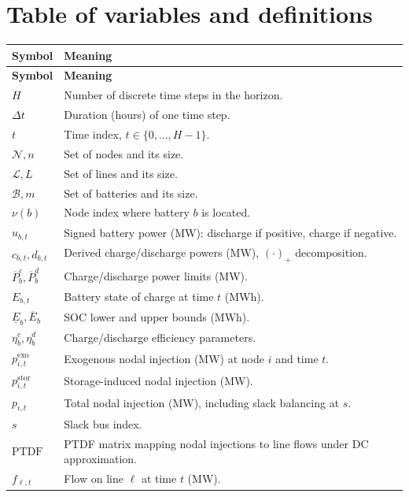 \documentclass[11pt]{article}
\begin{document}
\section{Table of variables and definitions}\label{app:notation}
\begin{longtable}{@{}>{\raggedright\arraybackslash}p{}p{}@{}}
\toprule
\textbf{Symbol} & \textbf{Meaning} \\
\midrule
\endfirsthead
\toprule
\textbf{Symbol} & \textbf{Meaning} \\
\midrule
\endhead
\bottomrule
\endfoot

$H$ & Number of discrete time steps in the horizon. \\
$\Delta t$ & Duration (hours) of one time step. \\
$t$ & Time index, $t\in\{0,\dots,H-1\}$. \\
$\mathcal{N}, n$ & Set of nodes and its size. \\
$\mathcal{L}, L$ & Set of lines and its size. \\
$\mathcal{B}, m$ & Set of batteries and its size. \\
$\nu(b)$ & Node index where battery $b$ is located. \\
$u_{b,t}$ & Signed battery power (MW): discharge if positive, charge if negative. \\
$c_{b,t}, d_{b,t}$ & Derived charge/discharge powers (MW), $(\cdot)_+$ decomposition. \\
$\overline{P}^c_b,\overline{P}^d_b$ & Charge/discharge power limits (MW). \\
$E_{b,t}$ & Battery state of charge at time $t$ (MWh). \\
$\underline{E}_b,\overline{E}_b$ & SOC lower and upper bounds (MWh). \\
$\eta^c_b,\eta^d_b$ & Charge/discharge efficiency parameters. \\
$p^{\mathrm{exo}}_{i,t}$ & Exogenous nodal injection (MW) at node $i$ and time $t$. \\
$p^{\mathrm{stor}}_{i,t}$ & Storage-induced nodal injection (MW). \\
$p_{i,t}$ & Total nodal injection (MW), including slack balancing at $s$. \\
$s$ & Slack bus index. \\
$\mathrm{PTDF}$ & PTDF matrix mapping nodal injections to line flows under DC approximation. \\
$f_{\ell,t}$ & Flow on line $\ell$ at time $t$ (MW). \\

\end{longtable}
\end{document}
